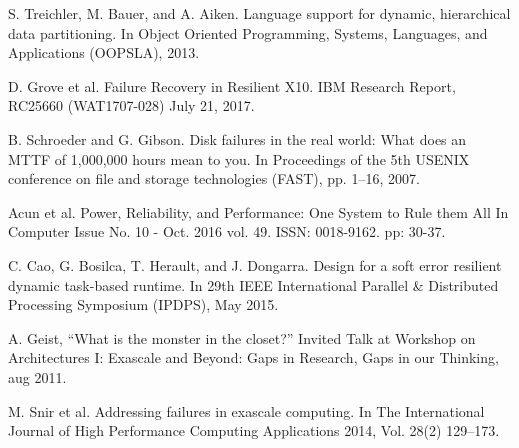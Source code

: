 \documentclass[conference]{IEEEtran}
\begin{document}
\begin{thebibliography}{00}
 S. Treichler, M. Bauer, and A. Aiken. Language support for
dynamic, hierarchical data partitioning. In Object Oriented Programming,
Systems, Languages, and Applications (OOPSLA), 2013.

D. Grove et al. Failure Recovery in Resilient X10. IBM Research
Report, RC25660 (WAT1707-028) July 21, 2017.

B. Schroeder and G. Gibson. Disk failures in
the real world: What does an MTTF of 1,000,000 hours mean to you. In 
Proceedings of the 5th USENIX conference on file and storage technologies
(FAST), pp. 1–16, 2007.

Acun et al. Power, Reliability, and Performance: One System to Rule them All
In Computer Issue No. 10 - Oct. 2016 vol. 49. ISSN: 0018-9162. pp: 30-37.

 C. Cao, G. Bosilca, T. Herault, and J. Dongarra. Design for a
soft error resilient dynamic task-based runtime. In 29th IEEE International
Parallel \& Distributed Processing Symposium (IPDPS), May 2015.

A. Geist, “What is the monster in the closet?” Invited Talk
at Workshop on Architectures I: Exascale and Beyond: Gaps in Research, Gaps in
our Thinking, aug 2011.

M. Snir et al. Addressing failures in exascale computing. In The
International Journal of High Performance Computing Applications 2014, Vol.
28(2) 129–173.

\end{thebibliography}
\end{document}
